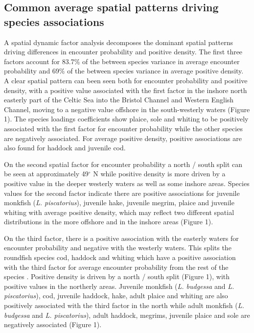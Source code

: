 \documentclass{nature}
\begin{document}
\subsection{Common average spatial patterns driving species associations} A
spatial dynamic factor analysis decomposes the dominant spatial patterns
driving differences in encounter probability and positive density. The first
three factors  account for 83.7\% of the between
species variance in average encounter probability and 69\% of the between
species variance in average positive density. A clear spatial pattern can been
seen both for encounter probability and positive density, with a positive value
associated with the first factor in the inshore north easterly part of the
Celtic Sea into the Bristol Channel and Western English Channel, moving to a
negative value offshore in the south-westerly waters (Figure 1).  The species
loadings coefficients show plaice, sole and whiting to be positively associated
with the first factor for encounter probability while the other species are
negatively associated. For average positive density, positive associations are
also found for haddock and juvenile cod.  

On the second spatial factor for encounter probability a north / south split
can be seen at approximately 49$^{\circ}$ N while positive density is more
driven by a positive value in the deeper westerly waters as well as some
inshore areas. Species values for the second factor indicate there are positive
associations for juvenile monkfish (\emph{L. piscatorius}), juvenile hake,
juvenile megrim, plaice and juvenile whiting with average positive density,
which may reflect two different spatial distributions in the more offshore and
in the inshore areas (Figure 1).

On the third factor, there is a positive association with the easterly waters
for encounter probability and negative with the westerly waters. This
 splits the
roundfish species cod, haddock and whiting which  have a positive
association with the third factor for average encounter probability from the
rest of the species .  Positive
density is driven by a north / south split (Figure 1), with positive values in
the northerly areas. Juvenile monkfish (\emph{L.  budgessa} and \emph{L.
	piscatorius}), cod, juvenile haddock, hake, adult plaice and whiting
are also positively associated with the third factor in the north while adult
monkfish (\emph{L. budgessa} and \emph{L.  piscatorius}), adult haddock,
megrims, juvenile plaice and sole are negatively associated  (Figure 1).
\end{document}
